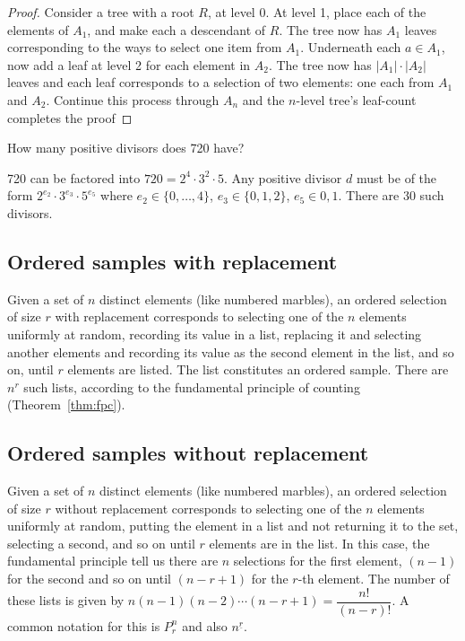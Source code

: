 \documentclass[../main.tex]{subfiles}
\begin{document}
\begin{proof}
	Consider a tree with a root $R$, at level 0. At level 1, place
	each of the elements of $A_1$, and make each a descendant of $R$. The tree
	now has $A_1$ leaves corresponding to the ways to select one item from $A_1$. 
	Underneath each $a \in A_1$, now add a leaf at level 2 for each element in $A_2$. The tree
	now has $|A_1| \cdot |A_2|$ leaves and each leaf corresponds to a selection of two elements: one each from $A_1$ and $A_2$. Continue this process through $A_n$ and
	the $n$-level tree's leaf-count completes the proof
\end{proof}

\begin{example}
	How many positive divisors does 720 have?
\end{example}
\begin{solution}
	720 can be factored into $720 = 2^4 \cdot 3^2 \cdot 5$. Any positive divisor $d$ must
	be of the form $2^{e_2}\cdot 3^{e_3}\cdot 5^{e_5}$ where $e_2 \in \{0,\ldots,4\}$,
	$e_3 \in \{0,1,2\}$, $e_5 \in {0,1}$. There are 30 such divisors.
\end{solution}

\subsection{Ordered samples with replacement}
Given a set of $n$ distinct elements (like numbered marbles), an
ordered selection of size $r$ with replacement corresponds to selecting
one of the $n$ elements uniformly at random, recording its value in a list,
replacing it and selecting another elements and recording its value as the 
second element in the list, and so on, until $r$ elements are listed. The list
constitutes an ordered sample. There are $n^r$ such lists, according to
the fundamental principle of counting (Theorem~\ref{thm:fpc}).
\subsection{Ordered samples without replacement}
Given a set of $n$ distinct elements (like numbered marbles), an
ordered selection of size $r$ without replacement corresponds to selecting
one of the $n$ elements uniformly at random, putting the element in a 
list and not returning it to the set, selecting a second, and so on until $r$ elements
are in the list. In this case, the fundamental principle tell us there are $n$ selections
for the first element, $(n-1)$ for the second and so on until $(n-r+1)$ for the $r$-th
element. The number of these lists is given by $n(n-1)(n-2)\cdots(n-r+1) = \dfrac{n!}{(n-r)!}$.
A common notation for this is $P^n_r$ and also $n^{\underline{r}}$.
\end{document}
